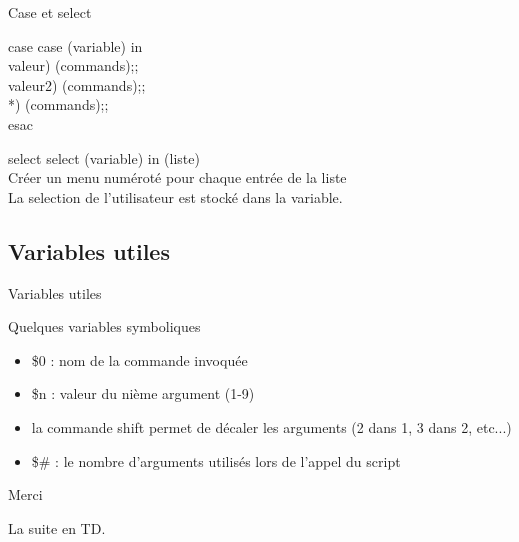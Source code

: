 \begin{frame}{Case et select}
\begin{block}{case}
case (variable) in\\
valeur) (commands);;\\
valeur2) (commands);;\\
*) (commands);;\\
esac
\end{block}

\begin{block}{select}
select (variable) in (liste)\\
Créer un menu numéroté pour chaque entrée de la liste\\
La selection de l'utilisateur est stocké dans la variable.
\end{block}
\end{frame}

\subsection{Variables utiles}
\begin{frame}{Variables utiles}
\begin{block}{Quelques variables symboliques}
\begin{itemize}
\item {\$}0 : nom de la commande invoquée
\item {\$}n : valeur du nième argument (1-9)
\item la commande shift permet de décaler les arguments (2 dans 1, 3 dans 2, etc...)
\item {\$}\# : le nombre d'arguments utilisés lors de l'appel du script
\end{itemize}
\end{block}
\end{frame}


\begin{frame}{Merci}
\begin{center}
La suite en TD.
\end{center}
\end{frame}





